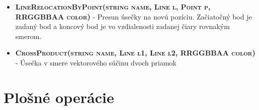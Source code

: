 \begin{itemize}
\item \textsc{\textbf{LineRelocationByPoint(string name, Line l, Point p, RRGGBBAA color)}} - Presun úsečky na novú pozíciu. Začiatočný bod je zadaný bod a koncový bod je vo vzdialenosti zadanej čiary rovnakým smerom.%
\item \textsc{\textbf{CrossProduct(string name, Line l1, Line l2, RRGGBBAA color)}} - Úsečka v smere vektorového súčinu dvoch priamok%

\end{itemize}




\section*{Plošné operácie}

